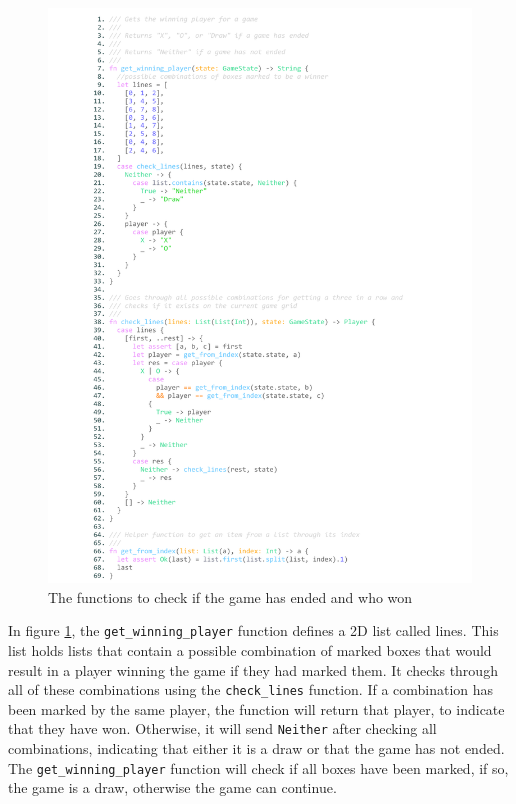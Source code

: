 \documentclass[]{final}
\begin{document}
\newpage

\begin{figure}[H]
  \centering
  \includegraphics[width=\textwidth]{winning.pdf}
  \caption{The functions to check if the game has ended and who won}\label{fig: winning}
\end{figure}

In figure \ref{fig: winning}, the \lstinline|get_winning_player| function defines a
2D list called lines. This list holds lists that contain a possible combination
of marked boxes that would result in a player winning the game if they had marked them.
It checks through all of these combinations using the \lstinline|check_lines| function.
If a combination has been marked by the same player, the function will return that player,
to indicate that they have won. Otherwise, it will send \lstinline|Neither| after checking all
combinations, indicating that either it is a draw or that the game has not ended.
The \lstinline|get_winning_player| function will check if all boxes have been marked,
if so, the game is a draw, otherwise the game can continue.
\end{document}
